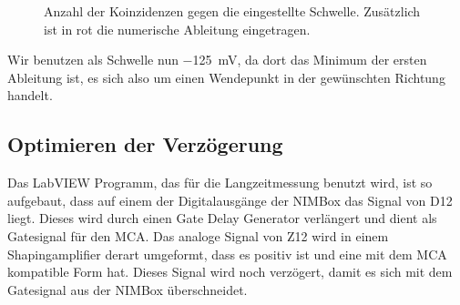 \documentclass[11pt, ngerman, fleqn, DIV=15, headinclude, BCOR=2cm]{scrreprt}
\begin{document}
\begin{figure}[htbp]
    \centering
    \caption{%
        Anzahl der Koinzidenzen gegen die eingestellte Schwelle. Zusätzlich ist
        in rot die numerische Ableitung eingetragen.
    }
    \label{fig:winkel-koinzidenz}
\end{figure}

Wir benutzen als Schwelle nun \SI{-125}{\milli\volt}, da dort das Minimum der
ersten Ableitung ist, es sich also um einen Wendepunkt in der gewünschten
Richtung handelt.

\subsection{Optimieren der Verzögerung}
\label{sec:optimieren_verzoegerung}

Das LabVIEW Programm, das für die Langzeitmessung benutzt wird, ist so
aufgebaut, dass auf einem der Digitalausgänge der NIMBox das Signal von D12
liegt. Dieses wird durch einen Gate Delay Generator verlängert und dient als
Gatesignal für den MCA. Das analoge Signal von Z12 wird in einem
Shapingamplifier derart umgeformt, dass es positiv ist und eine mit dem MCA
kompatible Form hat. Dieses Signal wird noch verzögert, damit es sich mit dem
Gatesignal aus der NIMBox überschneidet.
\end{document}
